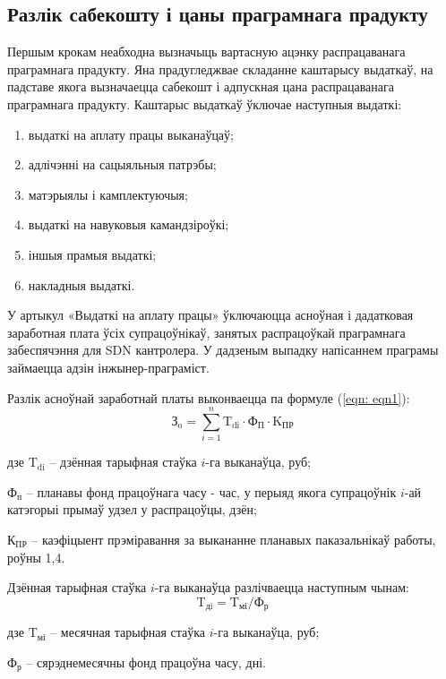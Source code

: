 \subsection{Разлік сабекошту і цаны праграмнага прадукту}

Першым крокам неабходна вызначыць вартасную ацэнку распрацаванага праграмнага прадукту. Яна прадугледжвае складанне каштарысу выдаткаў, на падставе якога вызначаецца сабекошт і адпускная цана распрацаванага праграмнага прадукту.
Каштарыс выдаткаў ўключае наступныя выдаткі:
\begin{enumerate}
    \item выдаткі на аплату працы выканаўцаў;
    \item адлічэнні на сацыяльныя патрэбы;
    \item матэрыялы і камплектуючыя;
    \item выдаткі на навуковыя камандзіроўкі;
    \item іншыя прамыя выдаткі;
    \item накладныя выдаткі.
\end{enumerate}

У артыкул «Выдаткі на аплату працы» ўключаюцца асноўная і дадатковая заработная плата ўсіх супрацоўнікаў, занятых распрацоўкай праграмнага забеспячэння для SDN кантролера. У дадзеным выпадку напісаннем праграмы займаецца адзін інжынер-праграміст.

Разлік асноўнай заработнай платы выконваецца па формуле (\ref{eqn: eqn1}):
\begin{equation}
    \label{eqn: eqn1}
    \text{З}_\text{o} = \sum_{i=1}^{n} \text{T}_\text{di} \cdot \text{Ф}_\text{П} \cdot \text{K}_\text{ПР}
\end{equation}
\begin{Explanation}
    \item[дзе] $\text{T}_\text{di}$ -- дзённая тарыфная стаўка $i$-га выканаўца, руб;
    \item $\text{Ф}_\text{п}$ -- планавы фонд працоўнага часу - час, у перыяд якога
        супрацоўнік $i$-ай катэгорыі прымаў удзел у распрацоўцы, дзён;
    \item $\text{К}_\text{ПР}$ -- каэфіцыент прэміравання за выкананне планавых
        паказальнікаў работы, роўны 1,4.
\end{Explanation}

Дзённая тарыфная стаўка $i$-га выканаўца разлічваецца наступным
чынам:
\begin{equation}
    \text{T}_\text{дi} = \text{T}_\text{мі} / \text{Ф}_\text{р}
\end{equation}
\begin{Explanation}
    \item[дзе] $\text{T}_\text{мі}$ -- месячная тарыфная стаўка $i$-га выканаўца, руб;
    \item $\text{Ф}_\text{р}$ -- сярэднемесячны фонд працоўна часу, дні.
\end{Explanation}

